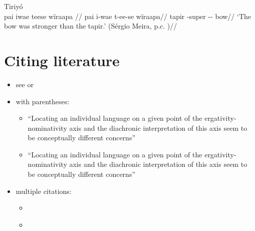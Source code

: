 \documentclass{article}
\begin{document}
\ex  Tiriyó  \\\label{tri-1}
\begingl \glpreamble pai iwae teese wïraapa //
\gla pai i-wae t-ee-se wïraapa//
\glb tapir -super -- bow//
\glft ‘The bow was stronger than the tapir.’ (Sérgio Meira, p.c.
)//
\endgl
\xe

\section{\texorpdfstring{Citing literature
\label{sec:sources}}{Citing literature }}

\begin{itemize}
\tightlist
\item
  see \textcites{alvarez1998split} or
  \textcites[133-134]{alvarez1998split}
\item
  with parentheses:

  \begin{itemize}
  \tightlist
  \item
    ``Locating an individual language on a given point of the
    ergativity-nominativity axis and the diachronic interpretation of
    this axis seem to be conceptually different concerns''
    \parencites{alvarez1998split}
  \item
    ``Locating an individual language on a given point of the
    ergativity-nominativity axis and the diachronic interpretation of
    this axis seem to be conceptually different concerns''
    \parencites[71]{alvarez1998split}
  \end{itemize}
\item
  multiple citations:

  \begin{itemize}
  \tightlist
  \item
    \textcites[133-134]{alvarez1998split}[218]{triomeira1999}
  \item
    \parencites[133-134]{alvarez1998split}[218]{triomeira1999}
  \end{itemize}
\end{itemize}

\printbibliography
\end{document}

